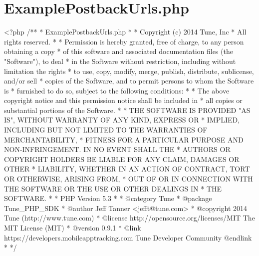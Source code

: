 \hypertarget{ExamplePostbackUrls_8php-example}{\section{Example\-Postback\-Urls.\-php}
}

\begin{DoxyCodeInclude}
<?php\textcolor{comment}{}
\textcolor{comment}{/**}
\textcolor{comment}{ * ExamplePostbackUrls.php}
\textcolor{comment}{ *}
\textcolor{comment}{ * Copyright (c) 2014 Tune, Inc}
\textcolor{comment}{ * All rights reserved.}
\textcolor{comment}{ *}
\textcolor{comment}{ * Permission is hereby granted, free of charge, to any person obtaining a copy}
\textcolor{comment}{ * of this software and associated documentation files (the "Software"), to deal}
\textcolor{comment}{ * in the Software without restriction, including without limitation the rights}
\textcolor{comment}{ * to use, copy, modify, merge, publish, distribute, sublicense, and/or sell}
\textcolor{comment}{ * copies of the Software, and to permit persons to whom the Software is}
\textcolor{comment}{ * furnished to do so, subject to the following conditions:}
\textcolor{comment}{ *}
\textcolor{comment}{ * The above copyright notice and this permission notice shall be included in}
\textcolor{comment}{ * all copies or substantial portions of the Software.}
\textcolor{comment}{ *}
\textcolor{comment}{ * THE SOFTWARE IS PROVIDED "AS IS", WITHOUT WARRANTY OF ANY KIND, EXPRESS OR}
\textcolor{comment}{ * IMPLIED, INCLUDING BUT NOT LIMITED TO THE WARRANTIES OF MERCHANTABILITY,}
\textcolor{comment}{ * FITNESS FOR A PARTICULAR PURPOSE AND NON-INFRINGEMENT. IN NO EVENT SHALL THE}
\textcolor{comment}{ * AUTHORS OR COPYRIGHT HOLDERS BE LIABLE FOR ANY CLAIM, DAMAGES OR OTHER}
\textcolor{comment}{ * LIABILITY, WHETHER IN AN ACTION OF CONTRACT, TORT OR OTHERWISE, ARISING FROM,}
\textcolor{comment}{ * OUT OF OR IN CONNECTION WITH THE SOFTWARE OR THE USE OR OTHER DEALINGS IN}
\textcolor{comment}{ * THE SOFTWARE.}
\textcolor{comment}{ *}
\textcolor{comment}{ * PHP Version 5.3}
\textcolor{comment}{ *}
\textcolor{comment}{ * @category  Tune}
\textcolor{comment}{ * @package   Tune\_PHP\_SDK}
\textcolor{comment}{ * @author    Jeff Tanner <jefft@tune.com>}
\textcolor{comment}{ * @copyright 2014 Tune (http://www.tune.com)}
\textcolor{comment}{ * @license   http://opensource.org/licenses/MIT The MIT License (MIT)}
\textcolor{comment}{ * @version   0.9.1}
\textcolor{comment}{ * @link      https://developers.mobileapptracking.com Tune Developer Community @endlink}
\textcolor{comment}{ *}
\textcolor{comment}{ */}


\end{DoxyCodeInclude}
